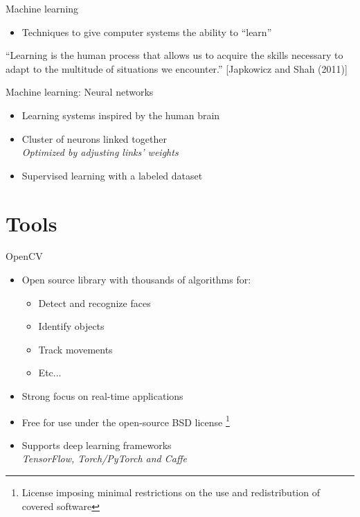 \documentclass{beamer}
\begin{document}
\begin{frame}{Machine learning}
    \begin{itemize}
        \item Techniques to give computer systems the ability to ``learn''
    \end{itemize}
    \vspace{1cm}

    ``Learning is the human process that allows us to acquire the skills necessary to adapt to the multitude of situations we encounter.'' [Japkowicz and Shah (2011)]

\end{frame}

\begin{frame}{Machine learning: Neural networks}
    \begin{itemize}
        \item Learning systems inspired by the human brain
        \item Cluster of neurons linked together \\
            \hspace{0.27cm}\textit{Optimized by adjusting links' weights}
        \item Supervised learning with a labeled dataset
    \end{itemize}
\end{frame}

\section{Tools}
\begin{frame}{OpenCV}
    \begin{itemize}
        \item Open source library with thousands of algorithms for:
        \begin{itemize}
            \item Detect and recognize faces
            \item Identify objects
            \item Track movements
            \item Etc...
        \end{itemize}
        \item Strong focus on real-time applications
        \item Free for use under the open-source BSD license \footnote{License imposing minimal restrictions on the use and redistribution of covered software}
        \item Supports deep learning frameworks \\
            \hspace{0.27cm}\textit{TensorFlow, Torch/PyTorch and Caffe}
    \end{itemize}
\end{frame}
\end{document}
